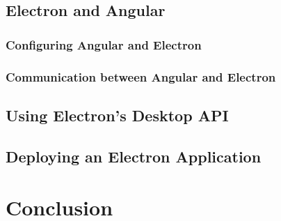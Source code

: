 \documentclass[11pt]{article}
\begin{document}
    \subsection{Electron and Angular}\label{subsec:developing-with-electron-angular}
    

    \subsubsection{Configuring Angular and Electron}\label{subsubsec:developing-with-electron-angular-config}
    

    \subsubsection{Communication between Angular and Electron}\label{subsubsec:developing-with-electron-angular-communication}
    
    \clearpage

    \subsection{Using Electron's Desktop API}\label{subsec:developing-with-electron-angular-api}
    

    \subsection{Deploying an Electron Application}\label{subsec:developing-with-electron-angular-deployment}
    
    \clearpage

    \section{Conclusion}\label{sec:conclusion}
    
    \clearpage

    \printnoidxglossary[type=\acronymtype]
    \clearpage
    \listoffigures
    \clearpage
    \lstlistoflistings
    \clearpage
    \printbibliography
    
    
\end{document}
